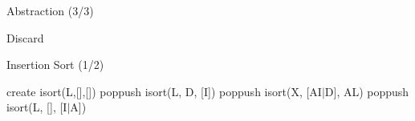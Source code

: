 \begin{frame}{Abstraction (3/3)}
  \begin{block}{Discard}
    \begin{figure}
      \centering
    \end{figure}
  \end{block}
\end{frame}

\begin{frame}{Insertion Sort (1/2)}
  \begin{enumerate}
     \small{ {create} {isort(L,[],[])}}
     \small{ {poppush} {isort(L, D, [I])}}
     \small{ {poppush} {isort(X, [AI$|$D], AL)}}
     \small{ {poppush} {isort(L, [], [I$|$A])}}
  \end{enumerate}
\end{frame}

